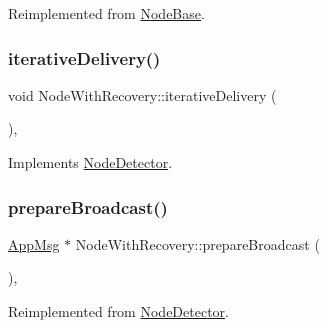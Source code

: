 Reimplemented from \hyperlink{classNodeBase_add2450264be5dd616f9f9ac94e83b988}{Node\+Base}.

\mbox{\label{classNodeWithRecovery_a9b61912f38b62452584dc80bf261ef4e}} 
\subsubsection{\texorpdfstring{iterative\+Delivery()}{iterativeDelivery()}}
{\footnotesize\ttfamily void Node\+With\+Recovery\+::iterative\+Delivery (\begin{DoxyParamCaption}{ }\end{DoxyParamCaption})\hspace{0.3cm}{\ttfamily [protected]}, {\ttfamily [virtual]}}



Implements \hyperlink{classNodeDetector_a17ecf9939fce7471f4513b66185743cc}{Node\+Detector}.

\mbox{\label{classNodeWithRecovery_a33d8e8775fd69cb647b38a54b36e1ebe}} 
\subsubsection{\texorpdfstring{prepare\+Broadcast()}{prepareBroadcast()}}
{\footnotesize\ttfamily \hyperlink{classAppMsg}{App\+Msg} $\ast$ Node\+With\+Recovery\+::prepare\+Broadcast (\begin{DoxyParamCaption}{ }\end{DoxyParamCaption})\hspace{0.3cm}{\ttfamily [protected]}, {\ttfamily [virtual]}}



Reimplemented from \hyperlink{classNodeDetector_af75cf37cc01fc51bc228a7a83c10cb97}{Node\+Detector}.

\mbox{\label{classNodeWithRecovery_a52ef51093d41e9b337987810311a7bc6}} 
